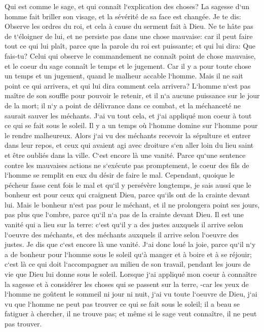 \verse Qui est comme le sage, et qui connaît l`explication des choses? La sagesse d`un homme fait briller son visage, et la sévérité de sa face est changée. 
\verse Je te dis: Observe les ordres du roi, et cela à cause du serment fait à Dieu. 
\verse Ne te hâte pas de t`éloigner de lui, et ne persiste pas dans une chose mauvaise: car il peut faire tout ce qui lui plaît, 
\verse parce que la parole du roi est puissante; et qui lui dira: Que fais-tu? 
\verse Celui qui observe le commandement ne connaît point de chose mauvaise, et le coeur du sage connaît le temps et le jugement. 
\verse Car il y a pour toute chose un temps et un jugement, quand le malheur accable l`homme. 
\verse Mais il ne sait point ce qui arrivera, et qui lui dira comment cela arrivera? 
\verse L`homme n`est pas maître de son souffle pour pouvoir le retenir, et il n`a aucune puissance sur le jour de la mort; il n`y a point de délivrance dans ce combat, et la méchanceté ne saurait sauver les méchants. 
\verse J`ai vu tout cela, et j`ai appliqué mon coeur à tout ce qui se fait sous le soleil. Il y a un temps où l`homme domine sur l`homme pour le rendre malheureux. 
\verse Alors j`ai vu des méchants recevoir la sépulture et entrer dans leur repos, et ceux qui avaient agi avec droiture s`en aller loin du lieu saint et être oubliés dans la ville. C`est encore là une vanité. 
\verse Parce qu`une sentence contre les mauvaises actions ne s`exécute pas promptement, le coeur des fils de l`homme se remplit en eux du désir de faire le mal. 
\verse Cependant, quoique le pécheur fasse cent fois le mal et qu`il y persévère longtemps, je sais aussi que le bonheur est pour ceux qui craignent Dieu, parce qu`ils ont de la crainte devant lui. 
\verse Mais le bonheur n`est pas pour le méchant, et il ne prolongera point ses jours, pas plus que l`ombre, parce qu`il n`a pas de la crainte devant Dieu. 
\verse Il est une vanité qui a lieu sur la terre: c`est qu`il y a des justes auxquels il arrive selon l`oeuvre des méchants, et des méchants auxquels il arrive selon l`oeuvre des justes. Je dis que c`est encore là une vanité. 
\verse J`ai donc loué la joie, parce qu`il n`y a de bonheur pour l`homme sous le soleil qu`à manger et à boire et à se réjouir; c`est là ce qui doit l`accompagner au milieu de son travail, pendant les jours de vie que Dieu lui donne sous le soleil. 
\verse Lorsque j`ai appliqué mon coeur à connaître la sagesse et à considérer les choses qui se passent sur la terre, -car les yeux de l`homme ne goûtent le sommeil ni jour ni nuit, 
\verse j`ai vu toute l`oeuvre de Dieu, j`ai vu que l`homme ne peut pas trouver ce qui se fait sous le soleil; il a beau se fatiguer à chercher, il ne trouve pas; et même si le sage veut connaître, il ne peut pas trouver. 


